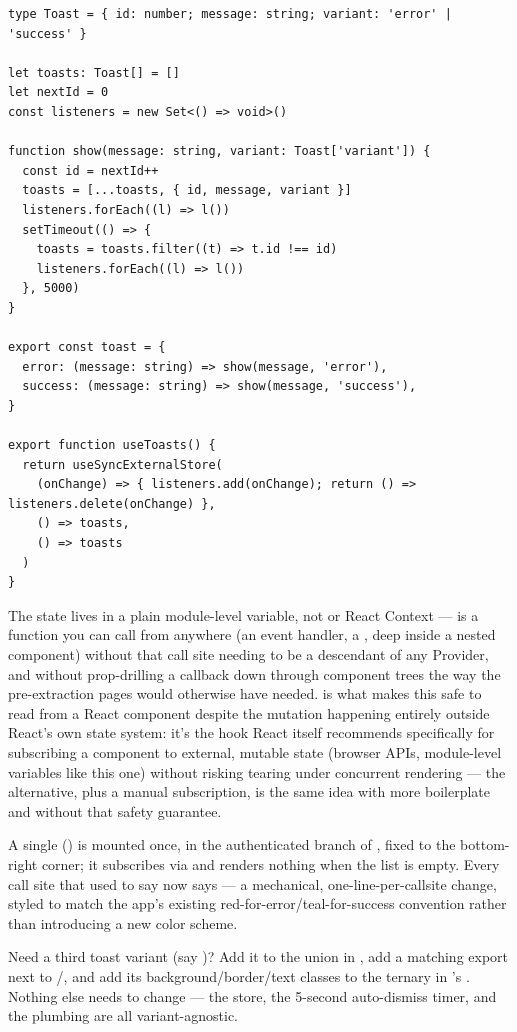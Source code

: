 \begin{lstlisting}[caption={src/hooks/use-toast.ts — module-level state, no Provider}]
type Toast = { id: number; message: string; variant: 'error' | 'success' }

let toasts: Toast[] = []
let nextId = 0
const listeners = new Set<() => void>()

function show(message: string, variant: Toast['variant']) {
  const id = nextId++
  toasts = [...toasts, { id, message, variant }]
  listeners.forEach((l) => l())
  setTimeout(() => {
    toasts = toasts.filter((t) => t.id !== id)
    listeners.forEach((l) => l())
  }, 5000)
}

export const toast = {
  error: (message: string) => show(message, 'error'),
  success: (message: string) => show(message, 'success'),
}

export function useToasts() {
  return useSyncExternalStore(
    (onChange) => { listeners.add(onChange); return () => listeners.delete(onChange) },
    () => toasts,
    () => toasts
  )
}
\end{lstlisting}

The state lives in a plain module-level variable, not  or React Context —  is a function you can call from anywhere (an event handler, a , deep inside a nested component) without that call site needing to be a descendant of any Provider, and without prop-drilling a  callback down through component trees the way the pre-extraction pages would otherwise have needed.  is what makes this safe to read from a React component despite the mutation happening entirely outside React's own state system: it's the hook React itself recommends specifically for subscribing a component to external, mutable state (browser APIs, module-level variables like this one) without risking tearing under concurrent rendering — the alternative,  plus a manual  subscription, is the same idea with more boilerplate and without that safety guarantee.

A single  () is mounted once, in the authenticated branch of , fixed to the bottom-right corner; it subscribes via  and renders nothing when the list is empty. Every call site that used to say  now says  — a mechanical, one-line-per-callsite change, styled to match the app's existing red-for-error/teal-for-success convention rather than introducing a new color scheme.

\begin{olkhowto}
Need a third toast variant (say )? Add it to the  union in , add a matching  export next to /, and add its background/border/text classes to the ternary in 's . Nothing else needs to change — the store, the 5-second auto-dismiss timer, and the  plumbing are all variant-agnostic.
\end{olkhowto}
